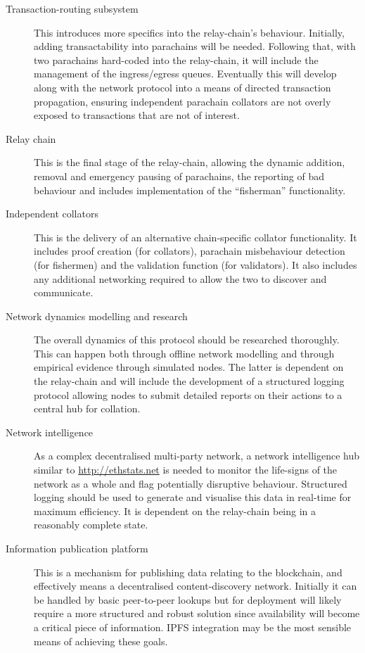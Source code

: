 \begin{description}
\item[Transaction-routing subsystem] This introduces more specifics into the relay-chain's behaviour. Initially, adding transactability into parachains will be needed. Following that, with two parachains hard-coded into the relay-chain, it will include the management of the ingress/egress queues. Eventually this will develop along with the network protocol into a means of directed transaction propagation, ensuring independent parachain collators are not overly exposed to transactions that are not of interest.

\item[Relay chain] This is the final stage of the relay-chain, allowing the dynamic addition, removal and emergency pausing of parachains, the reporting of bad behaviour and includes implementation of the ``fisherman'' functionality.

\item[Independent collators] This is the delivery of an alternative chain-specific collator functionality. It includes proof creation (for collators), parachain misbehaviour detection (for fishermen) and the validation function (for validators). It also includes any additional networking required to allow the two to discover and communicate.

\item[Network dynamics modelling and research] The overall dynamics of this protocol should be researched thoroughly. This can happen both through offline network modelling and through empirical evidence through simulated nodes. The latter is dependent on the relay-chain and will include the development of a structured logging protocol allowing nodes to submit detailed reports on their actions to a central hub for collation.

\item[Network intelligence] As a complex decentralised multi-party network, a network intelligence hub similar to \url{http://ethstats.net} is needed to monitor the life-signs of the network as a whole and flag potentially disruptive behaviour. Structured logging should be used to generate and visualise this data in real-time for maximum efficiency. It is dependent on the relay-chain being in a reasonably complete state.

\item[Information publication platform] This is a mechanism for publishing data relating to the blockchain, and effectively means a decentralised content-discovery network. Initially it can be handled by basic peer-to-peer lookups but for deployment will likely require a more structured and robust solution since availability will become a critical piece of information. IPFS integration may be the most sensible means of achieving these goals.


\end{description}
